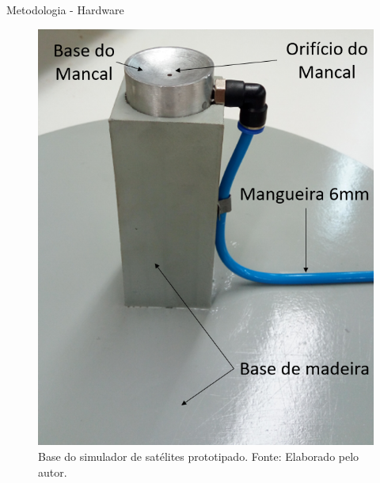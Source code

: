 \documentclass{beamer}
\begin{document}

\begin{frame}{Metodologia - Hardware}
    \begin{figure}[HT]
		\begin{center}
		\captionsetup{justification=centering}
        \includegraphics[scale=.3]{../metodologia/img/base_real}
        \caption{Base do simulador de satélites prototipado. \newline
        		 Fonte: Elaborado pelo autor.}
		\label{FIG_ADAPTATIVO}
        \end{center}
	\end{figure}
\end{frame}

\end{document}
